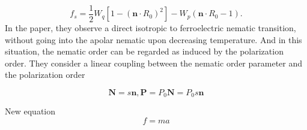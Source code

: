 \documentclass{article}
\begin{document}
\begin{dmath}
    f_s = \frac{1}{2}W_{q}\left[1- (\mathbf{n}\cdot R_{0})^2\right] - W_{p}(\mathbf{n}\cdot R_{0}-1).
\end{dmath}
In the paper, they observe a direct isotropic to ferroelectric nematic transition, without going into the apolar nematic upon decreasing temperature. And in this situation, the nematic order can be regarded as induced by the polarization order.
They consider a linear coupling between the nematic order parameter and the polarization order

\begin{equation}
    \mathbf{N}=s\mathbf{n}, \mathbf{P} = P_{0}\mathbf{N}=P_{0}s\mathbf{n}
\end{equation}

New equation
\begin{displaymath}
  f=ma
\end{displaymath}




\end{document}
